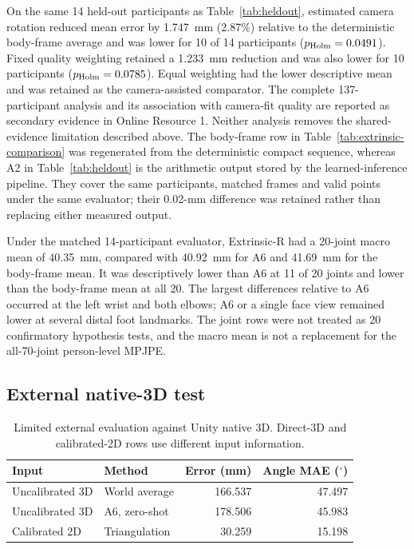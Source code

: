 \documentclass[lineno,pdflatex,sn-mathphys-num]{sn-jnl}
\begin{document}


On the same 14 held-out participants as Table~\ref{tab:heldout}, estimated
camera rotation reduced mean error by 1.747~mm (2.87\%) relative to the
deterministic body-frame average and was lower for 10 of 14 participants
($p_{\rm Holm}=0.0491$). Fixed quality weighting retained a 1.233~mm reduction
and was also lower for 10 participants ($p_{\rm Holm}=0.0785$). Equal weighting
had the lower descriptive mean and was retained as the camera-assisted
comparator. The complete 137-participant analysis and its association with
camera-fit quality are reported as secondary evidence in Online Resource 1.
Neither analysis removes the shared-evidence limitation described above.
The body-frame row in Table~\ref{tab:extrinsic-comparison} was regenerated from
the deterministic compact sequence, whereas A2 in Table~\ref{tab:heldout} is
the arithmetic output stored by the learned-inference pipeline. They cover the
same participants, matched frames and valid points under the same evaluator;
their 0.02-mm difference was retained rather than replacing either measured
output.



Under the matched 14-participant evaluator, Extrinsic-R had a 20-joint macro
mean of 40.35~mm, compared with 40.92~mm for A6 and 41.69~mm for the
body-frame mean. It was descriptively lower than A6 at 11 of 20 joints and
lower than the body-frame mean at all 20. The largest differences relative to
A6 occurred at the left wrist and both elbows; A6 or a single face view
remained lower at several distal foot landmarks. The joint rows were not
treated as 20 confirmatory hypothesis tests, and the macro mean is not a
replacement for the all-70-joint person-level MPJPE.

\subsection{External native-3D test}

\begin{table}[t]
\caption{Limited external evaluation against Unity native 3D. Direct-3D and
calibrated-2D rows use different input information.}
\label{tab:unity}
\centering
\small
\begin{tabular}{llrr}
\toprule
Input & Method & Error (mm) & Angle MAE ($^\circ$)\\
\midrule
Uncalibrated 3D & World average & 166.537 & 47.497\\
Uncalibrated 3D & A6, zero-shot & 178.506 & 45.983\\
Calibrated 2D & Triangulation & 30.259 & 15.198\\
\bottomrule
\end{tabular}
\end{table}
\end{document}
